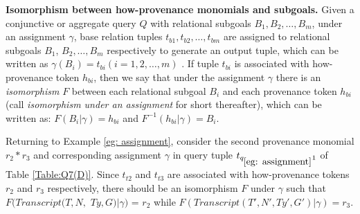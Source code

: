 \begin{definition}
{\bf Isomorphism between how-provenance monomials and subgoals.}  Given a conjunctive or aggregate query $Q$ with relational subgoals $B_1, B_2, \dots, B_m$,
\eat{\begin{tabbing}
\noindent
{\tt $Q(X_1, X_2,\dots, X_t) :- B_1, B_2, \dots, B_m, condition(Q)$}
\end{tabbing}}
under an assignment $\gamma$, base relation tuples $t_{b1}, t_{b2}, \dots, t_{bm}$ are assigned to relational subgoals $B_1$, $B_2, \dots, B_m$ respectively to generate an output tuple, which can be written as $\gamma(B_i) = t_{bi} (i=1,2,\dots, m)$ \cite{amsterdamer2011provenance}. If tuple $t_{bi}$ is associated with how-provenance token $h_{bi}$, then we say that under the assignment $\gamma$ there is an {\em isomorphism} $F$ between each relational subgoal $B_i$ and each provenance token $h_{bi}$ (call {\em isomorphism under an assignment} for short thereafter), which can be written as: $F(B_i|\gamma) = h_{bi}$ and $F^{-1}(h_{bi}|\gamma) = B_i$.
\end{definition}

Returning to Example \ref{eg: assignment}, consider the second provenance monomial $r_2*r_3$ and corresponding {assignment} $\gamma$ in query tuple $t_{q_{\ref{eg: assignment}}1}$ of Table \ref{Table:Q7(D)}. Since $t_{t2}$ and $t_{t3}$ are associated with how-provenance tokens $r_2$ and $r_3$ respectively, there should be an isomorphism $F$ under $\gamma$ such that $F(Transcript(T, N,$ $Ty, G)|\gamma)$ = $r_2$ while $F(Transcript(T', N', Ty', G')|\gamma) = r_3$.





